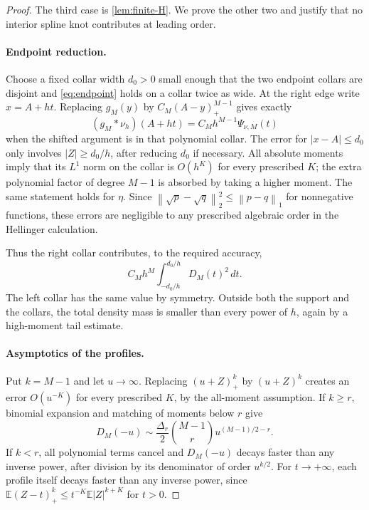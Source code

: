 \documentclass[11pt,a4paper]{article}
\numberwithin{equation}{section}
\theoremstyle{definition}
\theoremstyle{remark}
\newcommand{\E}{\mathbb E}
\newcommand{\norm}[1]{\left\lVert#1\right\rVert}
\begin{document}
\begin{proof}
The third case is \cref{lem:finite-H}. We prove the other two and justify
that no interior spline knot contributes at leading order.

\paragraph{Endpoint reduction.}
Choose a fixed collar width $d_0>0$ small enough that the two endpoint
collars are disjoint and \eqref{eq:endpoint} holds on a collar twice as
wide. At the right edge write $x=A+ht$. Replacing $g_M(y)$ by
$C_M(A-y)_+^{M-1}$ gives exactly
\[
 (g_M*\nu_h)(A+ht)=C_Mh^{M-1}\Psi_{\nu,M}(t)
\]
when the shifted argument is in that polynomial collar. The error for
$|x-A|\le d_0$ only involves $|Z|\ge d_0/h$, after reducing $d_0$ if
necessary. All absolute moments imply that its $L^1$ norm on the collar
is $O(h^K)$ for every prescribed $K$; the extra polynomial factor of degree
$M-1$ is absorbed by taking a higher moment. The same statement holds for
$\eta$. Since $\norm{\sqrt p-\sqrt q}_2^2\le\norm{p-q}_1$ for
nonnegative functions, these errors are negligible to any prescribed
algebraic order in the Hellinger calculation.

Thus the right collar contributes, to the required accuracy,
\begin{equation}
 C_Mh^M\int_{-d_0/h}^{d_0/h}D_M(t)^2\,dt.
 \label{eq:collar-profile}
\end{equation}
The left collar has the same value by symmetry. Outside both the support
and the collars, the total density mass is smaller than every power of
$h$, again by a high-moment tail estimate.

\paragraph{Asymptotics of the profiles.}
Put $k=M-1$ and let $u\to\infty$. Replacing $(u+Z)_+^k$ by
$(u+Z)^k$ creates an error $O(u^{-K})$ for every prescribed $K$, by the
all-moment assumption. If $k\ge r$, binomial expansion and matching of
moments below $r$ give
\begin{equation}
 D_M(-u)\sim\frac{\Delta_r}{2}\binom{M-1}{r}
 u^{(M-1)/2-r}.
 \label{eq:profile-tail}
\end{equation}
If $k<r$, all polynomial terms cancel and $D_M(-u)$ decays faster than
any inverse power, after division by its denominator of order $u^{k/2}$.
For $t\to+\infty$, each profile itself decays faster than any inverse
power, since
$\E (Z-t)_+^k\le t^{-K}\E|Z|^{k+K}$ for $t>0$.


\end{proof}
\end{document}
